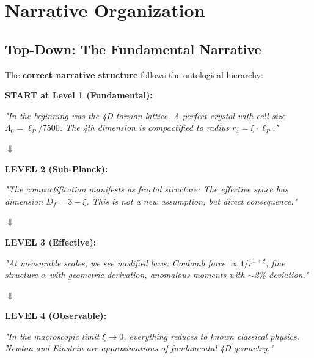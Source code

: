 	\section{Narrative Organization}
	
	\subsection{Top-Down: The Fundamental Narrative}
	
	The \textbf{correct narrative structure} follows the ontological hierarchy:
	
	\begin{revolutionary}
		\textbf{START at Level 1 (Fundamental):}
		
		\vspace{0.3cm}
		
		\textit{"In the beginning was the 4D torsion lattice. A perfect crystal with cell size $\Lambda_0 = \ell_P/7500$. The 4th dimension is compactified to radius $r_4 = \xi \cdot \ell_P$."}
		
		\vspace{0.3cm}
		
		$\Downarrow$
		
		\vspace{0.3cm}
		
		\textbf{LEVEL 2 (Sub-Planck):}
		
		\textit{"The compactification manifests as fractal structure: The effective space has dimension $D_f = 3-\xi$. This is not a new assumption, but direct consequence."}
		
		\vspace{0.3cm}
		
		$\Downarrow$
		
		\vspace{0.3cm}
		
		\textbf{LEVEL 3 (Effective):}
		
		\textit{"At measurable scales, we see modified laws: Coulomb force $\propto 1/r^{1+\xi}$, fine structure $\alpha$ with geometric derivation, anomalous moments with $\sim$2\% deviation."}
		
		\vspace{0.3cm}
		
		$\Downarrow$
		
		\vspace{0.3cm}
		
		\textbf{LEVEL 4 (Observable):}
		
		\textit{"In the macroscopic limit $\xi \to 0$, everything reduces to known classical physics. Newton and Einstein are approximations of fundamental 4D geometry."}
	\end{revolutionary}
	
